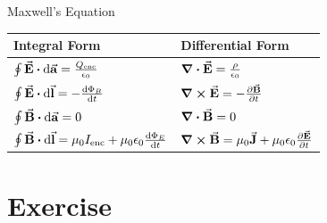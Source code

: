 \documentclass{beamer}
\begin{document}
\begin{frame}{Maxwell's Equation}
    \begin{table}[htbp]
        \centering
        \begin{tabular}{ll}
            \toprule
             Integral Form & Differential Form \\
            \midrule
            $\oint \va{E}\vdot\dd{\va{a}}=\frac{Q_{\text{enc}}}{\epsilon_0}$ & $\div{\va{E}} = \frac{\rho}{\epsilon_0}$ \\ \addlinespace
            $\oint \va{E}\vdot\dd{\va{l}}= -\dv{\Phi_B}{t}$ & $\curl{\va{E}}=-\pdv{\va{B}}{t}$ \\ \addlinespace
            $\oint \va{B}\vdot\dd{\va{a}}=0$ & $\div{\va{B}} = 0$ \\ \addlinespace
            $\oint \va{B}\vdot\dd{\va{l}}=\mu_0 I_{\text{enc}} + \mu_0 \epsilon_0 \dv{\Phi_E}{t}$ & $\curl{\va{B}}=\mu_0 \va{J}+ \mu_0 \epsilon_0 \pdv{\va{E}}{t}$             \\
            \bottomrule
        \end{tabular}
    \end{table}
\end{frame}


\section{Exercise}
\end{document}
